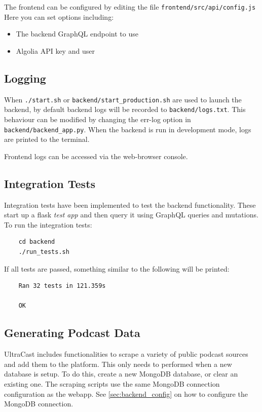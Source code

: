 \documentclass[../report.tex]{subfiles}
\begin{document}
The frontend can be configured by editing the file \verb|frontend/src/api/config.js| Here you can set options including:
\begin{itemize}
    \item The backend GraphQL endpoint to use
    \item Algolia API key and user
\end{itemize}

\subsection{Logging}

When \verb|./start.sh| or \verb|backend/start_production.sh| are used to launch the backend, by default backend logs will be recorded to \verb|backend/logs.txt|.
This behaviour can be modified by changing the err-log option in \verb|backend/backend_app.py|.
When the backend is run in development mode, logs are printed to the terminal.

Frontend logs can be accessed via the web-browser console.

\subsection{Integration Tests}

Integration tests have been implemented to test the backend functionality.
These start up a flask \textit{test app} and then query it using GraphQL queries and mutations.
\\
To run the integration tests:
\begin{verbatim}
    cd backend
    ./run_tests.sh
\end{verbatim}

If all tests are passed, something similar to the following will be printed:
\begin{verbatim}
    Ran 32 tests in 121.359s

    OK
\end{verbatim}

\subsection{Generating Podcast Data}

UltraCast includes functionalities to scrape a variety of public podcast sources and add them to the platform.
This only needs to performed when a new database is setup.
To do this, create a new MongoDB database, or clear an existing one.
The scraping scripts use the same MongoDB connection configuration as the webapp.
See \cref{sec:backend_config} on how to configure the MongoDB connection.
\end{document}
